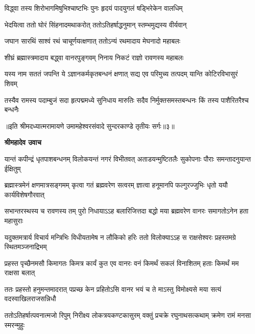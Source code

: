 \twolineshloka
{विद्ध्वा तस्य शिरोभागमिषुभिश्चाष्टभिः पुनः}
{हृदयं पादयुगलं षड्भिरेकेन वालधिम्} %

\twolineshloka
{भेदयित्वा ततो घोरं सिंहनादमथाकरोत्}
{ततोऽतिहर्षाद्धनुमान् स्तम्भमुद्यस्य वीर्यवान्} %

\twolineshloka
{जघान सारथिं साश्वं रथं चाचूर्णयत्क्षणात्}
{ततोऽन्यं रथमादाय मेघनादो महाबलः} %

\twolineshloka
{शीघ्रं ब्रह्मास्त्रमादाय बद्ध्वा वानरपुङ्गवम्}
{निनाय निकटं राज्ञो रावणस्य महाबलः} %

\fourlineindentedshloka
{यस्य नाम सततं जपन्ति ये\-}
{ऽज्ञानकर्मकृतबन्धनं क्षणात्}
{सद्य एव परिमुच्य तत्पदम्}
{यान्ति कोटिरविभासुरं शिवम्} %

\fourlineindentedshloka
{तस्यैव रामस्य पदाम्बुजं सदा}
{हृत्पद्ममध्ये सुनिधाय मारुतिः}
{सदैव निर्मुक्तसमस्तबन्धनः}
{किं तस्य पाशैरितरैश्च बन्धनैः} %

{॥इति श्रीमदध्यात्मरामायणे उमामहेश्वरसंवादे सुन्दरकाण्डे
तृतीयः सर्गः॥३॥
}




\textbf{श्रीमहादेव उवाच}

\fourlineindentedshloka
{यान्तं कपीन्द्रं धृतपाशबन्धनम्}
{विलोकयन्तं नगरं विभीतवत्}
{अताडयन्मुष्टितलैः सुकोपनाः}
{पौराः समन्तादनुयान्त ईक्षितुम्} %

\fourlineindentedshloka
{ब्रह्मास्त्रमेनं क्षणमात्रसङ्गमम्}
{कृत्वा गतं ब्रह्मवरेण सत्वरम्}
{ज्ञात्वा हनूमानपि फल्गुरज्जुभिः}
{धृतो ययौ कार्यविशेषगौरवात्} %

\fourlineindentedshloka
{सभान्तरस्थस्य च रावणस्य तम्}
{पुरो निधायाऽऽह बलारिजित्तदा}
{बद्धो मया ब्रह्मवरेण वानरः}
{समागतोऽनेन हता महासुराः} %

\fourlineindentedshloka
{यदुक्तमत्रार्य विचार्य मन्त्रिभिः}
{विधीयतामेष न लौकिको हरिः}
{ततो विलोक्याऽऽह स राक्षसेश्वरः}
{प्रहस्तमग्रे स्थितमञ्जनाद्रिभम्} %

\fourlineindentedshloka
{प्रहस्त पृच्छैनमसौ किमागतः}
{किमत्र कार्यं कुत एव वानरः}
{वनं किमर्थं सकलं विनाशितम्}
{हताः किमर्थं मम राक्षसा बलात्} %

\fourlineindentedshloka
{ततः प्रहस्तो हनुमन्तमादरात्}
{पप्रच्छ केन प्रहितोऽसि वानर}
{भयं च ते माऽस्तु विमोक्ष्यसे मया}
{सत्यं वदस्वाखिलराजसन्निधौ} %

\fourlineindentedshloka
{ततोऽतिहर्षात्पवनात्मजो रिपुम्}
{निरीक्ष्य लोकत्रयकण्टकासुरम्}
{वक्तुं प्रचक्रे रघुनाथसत्कथाम्}
{क्रमेण रामं मनसा स्मरन्मुहुः} %

